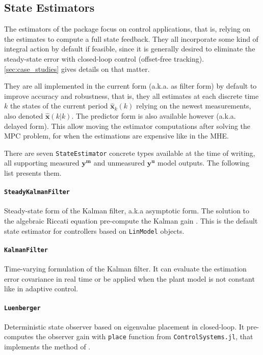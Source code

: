 \subsection{State Estimators}

The estimators of the package focus on control applications, that is, relying on the estimates to compute a full state feedback. They all incorporate some kind of integral action by default if feasible, since it is generally desired to eliminate the steady-state error with closed-loop control (offset-free tracking). \cref{sec:case_studies} gives details on that matter.

They are all implemented in the current form (a.k.a. as filter form) by default to improve accuracy and robustness, that is, they all estimates at each discrete time $k$ the states of the current period $\mathbf{\hat{x}}_k(k)$ relying on the newest measurements, also denoted $\mathbf{\hat{x}}(k|k)$. The predictor form is also available however (a.k.a. delayed form). This allow moving the estimator computations after solving the MPC problem, for when the estimations are expensive like in the MHE.

There are seven \texttt{StateEstimator} concrete types available at the time of writing, all supporting measured $\mathbf{y^m}$ and unmeasured $\mathbf{y^u}$ model outputs. The following list presents them.

\paragraph{\textnormal{\texttt{SteadyKalmanFilter}}}
Steady-state form of the Kalman filter, a.k.a asymptotic form. The solution to the algebraic Riccati equation pre-compute the Kalman gain \citep{simon}. This is the default state estimator for controllers based on \texttt{LinModel} objects.

\paragraph{\textnormal{\texttt{KalmanFilter}}}
Time-varying formulation of the Kalman filter. It can evaluate the estimation error covariance in real time or be applied when the plant model is not constant like in adaptive control.

\paragraph{\textnormal{\texttt{Luenberger}}}
Deterministic state observer based on eigenvalue placement in closed-loop. It pre-computes the observer gain with \texttt{place} function from \texttt{ControlSystems.jl}, that implements the method of \citet{placePoles}.


